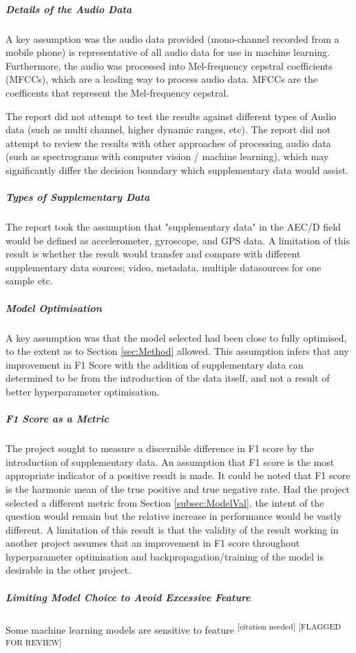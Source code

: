 \documentclass{UoNMCHA}
\newcommand{\citationneeded}{\textsuperscript{\color{blue} [citation needed]}}
\newcommand{\flagforreview}{\textsuperscript{\color{red} [FLAGGED FOR REVIEW]}}
\newcommand{\sref}[1] {Section \ref{#1}}
\numberwithin{equation}{section}
\begin{document}
\subparagraph{Details of the Audio Data}
A key assumption was the audio data provided (mono-channel recorded from a mobile phone) is representative of all audio data for use in machine learning. Furthermore, the audio was processed into Mel-frequency cepstral coefficients (MFCCs), which are a leading way to process audio data. MFCCs are the coefficents that represent the Mel-frequency cepstral. 

The report did not attempt to test the results against different types of Audio data (such as multi channel, higher dynamic ranges, etc). The report did not attempt to review the results with other approaches of processing audio data (such as spectrograms with computer vision / machine learning), which may significantly differ the decision boundary which supplementary data would assist.

\subparagraph{Types of Supplementary Data}
The report took the assumption that "supplementary data" in the AEC/D field would be defined as accelerometer, gyroscope, and GPS data. A limitation of this result is whether the result would transfer and compare with different supplementary data sources; video, metadata, multiple datasources for one sample etc. 

\subparagraph{Model Optimisation}
A key assumption was that the model selected had been close to fully optimised, to the extent as to \sref{sec:Method} allowed. This assumption infers that any improvement in F1 Score with the addition of supplementary data can determined to be from the introduction of the data itself, and not a result of better hyperparameter optimisation.

\subparagraph{F1 Score as a Metric}
The project sought to measure a discernible difference in F1 score by the introduction of supplementary data. An assumption that F1 score is the most appropriate indicator of a positive result is made. It could be noted that F1 score is the harmonic mean of the true positive and true negative rate. Had the project selected a different metric from \sref{subsec:ModelVal}, the intent of the question would remain but the relative increase in performance would be vastly different. A limitation of this result is that the validity of the result working in another project assumes that an improvement in F1 score throughout hyperparameter optimisation and backpropagation/training of the model is desirable in the other project.

\subparagraph{Limiting Model Choice to Avoid Excessive Feature}
Some machine learning models are sensitive to feature \citationneeded \flagforreview
\end{document}
